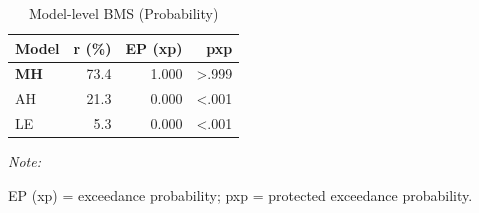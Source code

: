 \begin{table}[!h]
\centering
\caption{Model-level BMS (Probability)}
\centering
\begin{threeparttable}
\begin{tabular}[t]{lrrr}
\toprule
Model & r (\%) & EP (xp) & pxp\\
\midrule
\textbf{MH} & 73.4 & 1.000 & >.999\\
AH & 21.3 & 0.000 & <.001\\
LE & 5.3 & 0.000 & <.001\\
\bottomrule
\end{tabular}
\begin{tablenotes}
\item \textit{Note: } 
\item EP (xp) = exceedance probability; pxp = protected exceedance probability.
\end{tablenotes}
\end{threeparttable}
\end{table}
